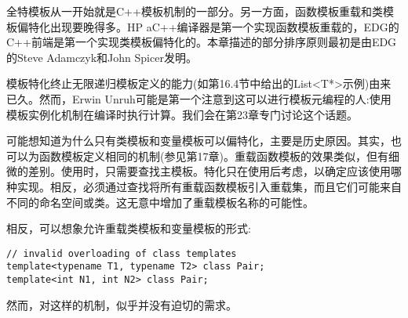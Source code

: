 全特模板从一开始就是C++模板机制的一部分。另一方面，函数模板重载和类模板偏特化出现要晚得多。HP aC++编译器是第一个实现函数模板重载的，EDG的C++前端是第一个实现类模板偏特化的。本章描述的部分排序原则最初是由EDG的Steve Adamczyk和John Spicer发明。

模板特化终止无限递归模板定义的能力(如第16.4节中给出的List<T*>示例)由来已久。然而，Erwin Unruh可能是第一个注意到这可以进行模板元编程的人:使用模板实例化机制在编译时执行计算。我们会在第23章专门讨论这个话题。

可能想知道为什么只有类模板和变量模板可以偏特化，主要是历史原因。其实，也可以为函数模板定义相同的机制(参见第17章)。重载函数模板的效果类似，但有细微的差别。使用时，只需要查找主模板。特化只在使用后考虑，以确定应该使用哪种实现。相反，必须通过查找将所有重载函数模板引入重载集，而且它们可能来自不同的命名空间或类。这无意中增加了重载模板名称的可能性。

相反，可以想象允许重载类模板和变量模板的形式:

\begin{lstlisting}[style=styleCXX]
// invalid overloading of class templates
template<typename T1, typename T2> class Pair;
template<int N1, int N2> class Pair;
\end{lstlisting}

然而，对这样的机制，似乎并没有迫切的需求。